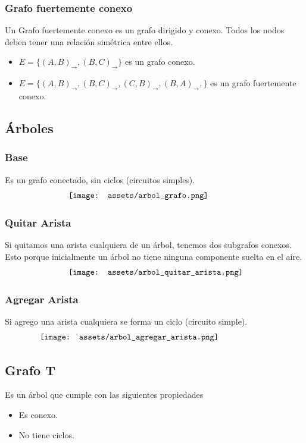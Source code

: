 \documentclass[10pt,a4paper]{article}
\begin{document}
\subsubsection*{Grafo fuertemente conexo}
Un Grafo fuertemente conexo es un grafo dirigido y conexo. Todos los nodos deben tener una relación simétrica entre ellos.
\begin{itemize}
    \item $E = \{(A,B)_{\rightarrow}, (B, C)_{\rightarrow}\}$ es un grafo conexo.
    \item $E = \{(A, B)_{\rightarrow}, (B, C)_{\rightarrow}, (C, B)_{\rightarrow}, (B, A)_{\rightarrow},\}$ es un grafo fuertemente conexo.
\end{itemize}
\subsection*{Árboles}
\subsubsection*{Base}
Es un grafo conectado, sin ciclos (circuitos simples).
\[\begin{minipage}[b]{0.6\textwidth}
    \texttt{[image: assets/arbol\_grafo.png]}
\end{minipage}\]
\subsubsection*{Quitar Arista}
Si quitamos una arista cualquiera de un árbol, tenemos dos subgrafos conexos. Esto porque inicialmente un árbol no tiene ninguna componente suelta en el aire. 
\[\begin{minipage}[b]{0.6\textwidth}
    \texttt{[image: assets/arbol\_quitar\_arista.png]}
\end{minipage}\]
\subsubsection*{Agregar Arista}
Si agrego una arista cualquiera se forma un ciclo (circuito simple).
\[\begin{minipage}[b]{0.8\textwidth}
    \texttt{[image: assets/arbol\_agregar\_arista.png]}
\end{minipage}\]
\subsection*{Grafo T}
Es un árbol que cumple con las siguientes propiedades
\begin{itemize}
    \item Es conexo.
    \item No tiene ciclos. 
\end{itemize}
\end{document}
